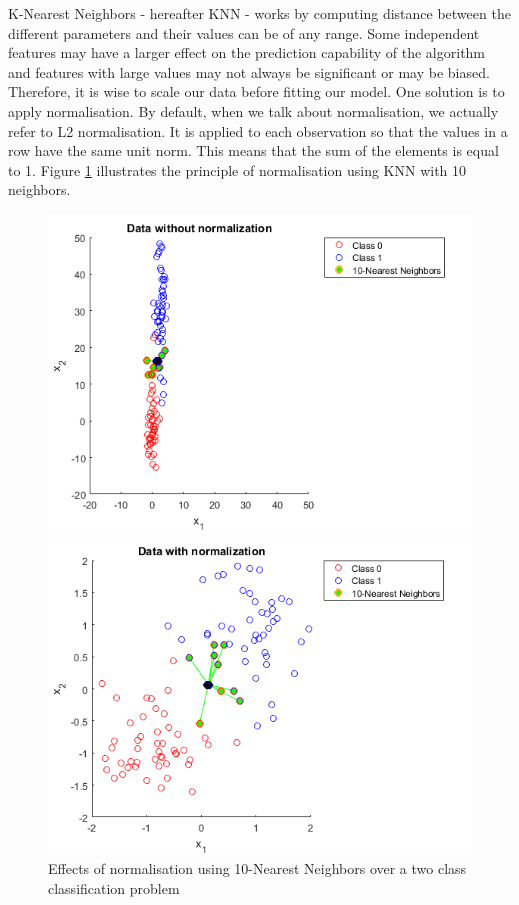 K-Nearest Neighbors - hereafter KNN - works by computing distance between the different parameters and their values can be of any range. Some independent features may have a larger effect on the prediction capability of the algorithm and features with large values may not always be significant or may be biased. Therefore, it is wise to scale our data before fitting our model. One solution is to apply normalisation. By default, when we talk about normalisation, we actually refer to L2 normalisation. It is applied to each observation so that the values in a row have the same unit norm. This means that the sum of the elements is equal to 1. Figure \ref{fig:norma} illustrates the principle of normalisation using KNN with 10 neighbors.
\begin{figure}[ht]
\centering
    \begin{minipage}[b]{0.48\textwidth}
    \includegraphics[width=\textwidth]{Figures/norma1.png}
\end{minipage}
\quad
\begin{minipage}[b]{0.48\textwidth}
    \includegraphics[width=\textwidth]{Figures/norma2.png}
\end{minipage}
\captionsetup{justification=centering}
\caption{Effects of normalisation using 10-Nearest Neighbors over a two class classification problem \cite{norma_source}}
\label{fig:norma}
\end{figure}

